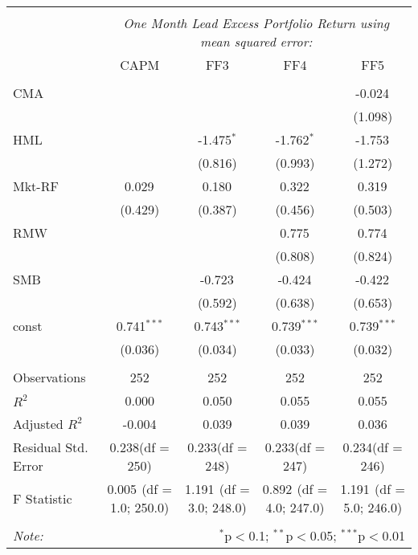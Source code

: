 \begin{table}[!htbp] \centering
\begin{tabular}{@{\extracolsep{5pt}}lcccc}
\\[-1.8ex]\hline
\hline \\[-1.8ex]
& \multicolumn{4}{c}{\textit{One Month Lead Excess Portfolio Return using mean squared error:}} \
\cr \cline{4-5}
\\[-1.8ex] & CAPM & FF3 & FF4 & FF5 \\
\hline \\[-1.8ex]
 CMA & & & & -0.024$^{}$ \\
  & & & & (1.098) \\
 HML & & -1.475$^{*}$ & -1.762$^{*}$ & -1.753$^{}$ \\
  & & (0.816) & (0.993) & (1.272) \\
 Mkt-RF & 0.029$^{}$ & 0.180$^{}$ & 0.322$^{}$ & 0.319$^{}$ \\
  & (0.429) & (0.387) & (0.456) & (0.503) \\
 RMW & & & 0.775$^{}$ & 0.774$^{}$ \\
  & & & (0.808) & (0.824) \\
 SMB & & -0.723$^{}$ & -0.424$^{}$ & -0.422$^{}$ \\
  & & (0.592) & (0.638) & (0.653) \\
 const & 0.741$^{***}$ & 0.743$^{***}$ & 0.739$^{***}$ & 0.739$^{***}$ \\
  & (0.036) & (0.034) & (0.033) & (0.032) \\
\hline \\[-1.8ex]
 Observations & 252 & 252 & 252 & 252 \\
 $R^2$ & 0.000 & 0.050 & 0.055 & 0.055 \\
 Adjusted $R^2$ & -0.004 & 0.039 & 0.039 & 0.036 \\
 Residual Std. Error & 0.238(df = 250) & 0.233(df = 248) & 0.233(df = 247) & 0.234(df = 246)  \\
 F Statistic & 0.005$^{}$ (df = 1.0; 250.0) & 1.191$^{}$ (df = 3.0; 248.0) & 0.892$^{}$ (df = 4.0; 247.0) & 1.191$^{}$ (df = 5.0; 246.0) \\
\hline
\hline \\[-1.8ex]
\textit{Note:} & \multicolumn{4}{r}{$^{*}$p$<$0.1; $^{**}$p$<$0.05; $^{***}$p$<$0.01} \\
\end{tabular}
\end{table}
